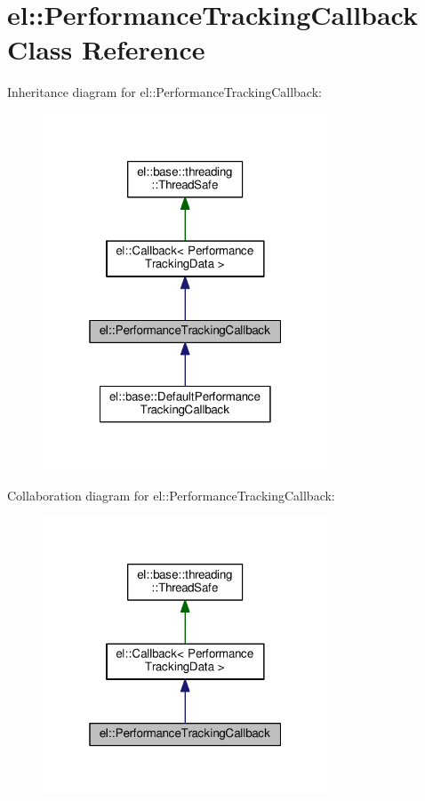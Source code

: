 \hypertarget{classel_1_1_performance_tracking_callback}{}\section{el\+:\+:Performance\+Tracking\+Callback Class Reference}
\label{classel_1_1_performance_tracking_callback}


Inheritance diagram for el\+:\+:Performance\+Tracking\+Callback\+:
\nopagebreak
\begin{figure}[H]
\begin{center}
\leavevmode
\includegraphics[width=241pt]{classel_1_1_performance_tracking_callback__inherit__graph}
\end{center}
\end{figure}


Collaboration diagram for el\+:\+:Performance\+Tracking\+Callback\+:
\nopagebreak
\begin{figure}[H]
\begin{center}
\leavevmode
\includegraphics[width=241pt]{classel_1_1_performance_tracking_callback__coll__graph}
\end{center}
\end{figure}
